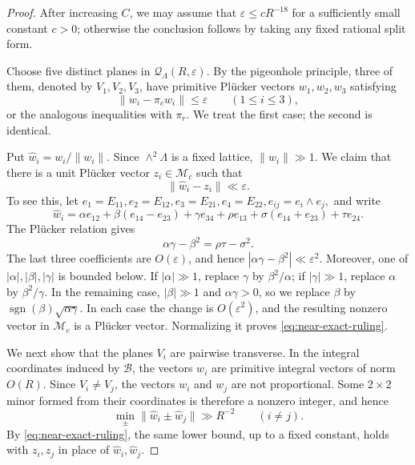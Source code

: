 \documentclass[10pt,a4paper]{amsart}
\begin{document}
\begin{proof}
 After increasing $C$, we
may assume that
$
\varepsilon\le cR^{-18}
$
for a sufficiently small constant $c>0$; otherwise the conclusion follows
by taking any fixed rational split form.

Choose five distinct planes in $\mathcal Q_\Lambda(R,\varepsilon)$. By the
pigeonhole principle, three of them, denoted by $V_1,V_2,V_3$, have
primitive Pl\"ucker vectors $w_1,w_2,w_3$ satisfying
$$
\|w_i-\pi_cw_i\|\le\varepsilon
\qquad
(1\le i\le3),
$$
or the analogous inequalities with $\pi_r$. We treat the first case; the
second is identical.

Put $\widehat w_i=w_i/\|w_i\|$. Since $\wedge^2\Lambda$ is a fixed lattice,
$\|w_i\|\gg1$. We claim that there is a unit Pl\"ucker vector
$z_i\in\mathcal M_c$ such that
\begin{equation}\label{eq:near-exact-ruling}
\|\widehat w_i-z_i\|\ll\varepsilon.
\end{equation}
To see this, let
$
e_1=E_{11}, e_2=E_{12},
e_3=E_{21}, e_4=E_{22},
e_{ij}=e_i\wedge e_j,
$
and write
$$
\widehat w_i
=
\alpha e_{12}
+\beta(e_{14}-e_{23})
+\gamma e_{34}
+\rho e_{13}
+\sigma(e_{14}+e_{23})
+\tau e_{24}.
$$
The Pl\"ucker relation gives
$$
\alpha\gamma-\beta^2=\rho\tau-\sigma^2.
$$
The last three coefficients are $O(\varepsilon)$, and hence
$|\alpha\gamma-\beta^2|\ll\varepsilon^2$. Moreover, one of
$|\alpha|,|\beta|,|\gamma|$ is bounded below. If $|\alpha|\gg1$, replace
$\gamma$ by $\beta^2/\alpha$; if $|\gamma|\gg1$, replace $\alpha$ by
$\beta^2/\gamma$. In the remaining case, $|\beta|\gg1$ and
$\alpha\gamma>0$, so we replace $\beta$ by
$\operatorname{sgn}(\beta)\sqrt{\alpha\gamma}$. In each case the change is
$O(\varepsilon^2)$, and the resulting nonzero vector in $\mathcal M_c$ is
a Pl\"ucker vector. Normalizing it proves
\eqref{eq:near-exact-ruling}.

We next show that the planes $V_i$ are pairwise transverse. In the integral
coordinates induced by $\mathcal B$, the vectors $w_i$ are primitive
integral vectors of norm $O(R)$. Since $V_i\ne V_j$, the vectors $w_i$ and
$w_j$ are not proportional. Some $2\times2$ minor formed from their
coordinates is therefore a nonzero integer, and hence
\begin{equation}\label{eq:plucker-separation}
\min_{\pm}\|\widehat w_i\pm\widehat w_j\|
\gg R^{-2}
\qquad
(i\ne j).
\end{equation}
By \eqref{eq:near-exact-ruling}, the same lower bound, up to a fixed
constant, holds with $z_i,z_j$ in place of
$\widehat w_i,\widehat w_j$.


\end{proof}
\end{document}
